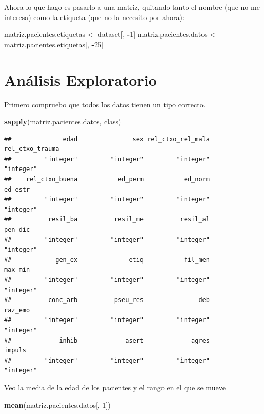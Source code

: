 \documentclass[]{article}
\newenvironment{Shaded}{\begin{snugshade}}{\end{snugshade}}
\newcommand{\KeywordTok}[1]{\textcolor[rgb]{0.13,0.29,0.53}{\textbf{#1}}}
\newcommand{\DecValTok}[1]{\textcolor[rgb]{0.00,0.00,0.81}{#1}}
\newcommand{\StringTok}[1]{\textcolor[rgb]{0.31,0.60,0.02}{#1}}
\newcommand{\OperatorTok}[1]{\textcolor[rgb]{0.81,0.36,0.00}{\textbf{#1}}}
\newcommand{\NormalTok}[1]{#1}
\begin{document}
Ahora lo que hago es pasarlo a una matriz, quitando tanto el nombre (que
no me interesa) como la etiqueta (que no la necesito por ahora):

\begin{Shaded}
\begin{Highlighting}[]
\NormalTok{matriz.pacientes.etiquetas <-}\StringTok{ }\NormalTok{dataset[, }\OperatorTok{-}\DecValTok{1}\NormalTok{]}
\NormalTok{matriz.pacientes.datos <-}\StringTok{ }\NormalTok{matriz.pacientes.etiquetas[, }\OperatorTok{-}\DecValTok{25}\NormalTok{]}
\end{Highlighting}
\end{Shaded}

\section{Análisis Exploratorio}\label{analisis-exploratorio}

Primero compruebo que todos los datos tienen un tipo correcto.

\begin{Shaded}
\begin{Highlighting}[]
\KeywordTok{sapply}\NormalTok{(matriz.pacientes.datos, class)}
\end{Highlighting}
\end{Shaded}

\begin{verbatim}
##              edad               sex rel_ctxo_rel_mala   rel_ctxo_trauma 
##         "integer"         "integer"         "integer"         "integer" 
##    rel_ctxo_buena           ed_perm           ed_norm           ed_estr 
##         "integer"         "integer"         "integer"         "integer" 
##          resil_ba          resil_me          resil_al           pen_dic 
##         "integer"         "integer"         "integer"         "integer" 
##            gen_ex              etiq           fil_men           max_min 
##         "integer"         "integer"         "integer"         "integer" 
##          conc_arb          pseu_res               deb           raz_emo 
##         "integer"         "integer"         "integer"         "integer" 
##             inhib             asert             agres            impuls 
##         "integer"         "integer"         "integer"         "integer"
\end{verbatim}

Veo la media de la edad de los pacientes y el rango en el que se mueve

\begin{Shaded}
\begin{Highlighting}[]
\KeywordTok{mean}\NormalTok{(matriz.pacientes.datos[, }\DecValTok{1}\NormalTok{])}
\end{Highlighting}
\end{Shaded}
\end{document}
